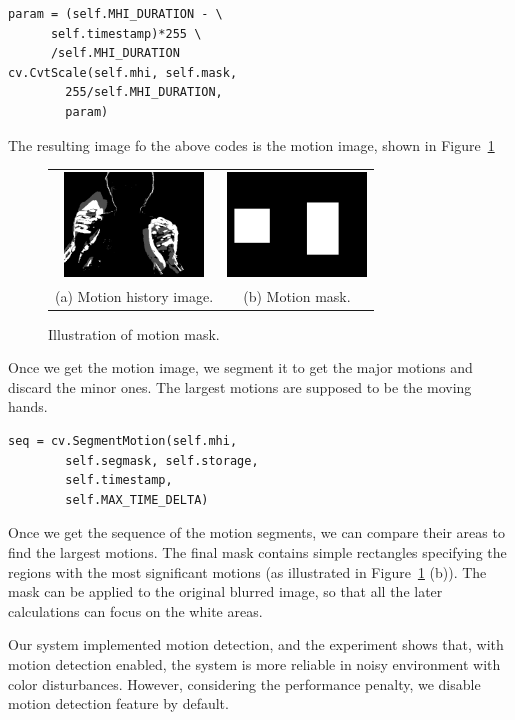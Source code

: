 \documentclass[10pt,twocolumn,letterpaper]{article}
\begin{document}
\begin{verbatim}
param = (self.MHI_DURATION - \
      self.timestamp)*255 \
      /self.MHI_DURATION
cv.CvtScale(self.mhi, self.mask, 
        255/self.MHI_DURATION,
        param)
\end{verbatim}

The resulting image fo the above codes is the motion image, shown in Figure~\ref{fig:motion}

\begin{figure}[h]
\centering
\begin{tabular}{cc}
\includegraphics[width=3.7cm]{motion.png} &
\includegraphics[width=3.7cm]{motionmask.png} \\
(a) Motion history image.&
(b) Motion mask.
\end{tabular}
\caption{Illustration of motion mask.}
\label{fig:motion}
\end{figure}


Once we get the motion image, we segment it to get the major motions 
and discard the minor ones. The largest motions are supposed to be the moving hands.
\begin{verbatim}
seq = cv.SegmentMotion(self.mhi, 
        self.segmask, self.storage, 
        self.timestamp,
        self.MAX_TIME_DELTA) 
\end{verbatim}
Once we get the sequence of the motion segments, we can compare 
their areas to find the largest motions. The final mask 
contains simple rectangles specifying the regions with the most 
significant motions (as illustrated in Figure~\ref{fig:motion} (b)). The 
mask can be applied to the original blurred image, so that all 
the later calculations can focus on the white areas.

Our system implemented motion detection, and 
the experiment shows that, with motion detection enabled, 
the system is more reliable in noisy environment with color 
disturbances. However, considering the performance penalty, we 
disable motion detection feature by default.
\end{document}
